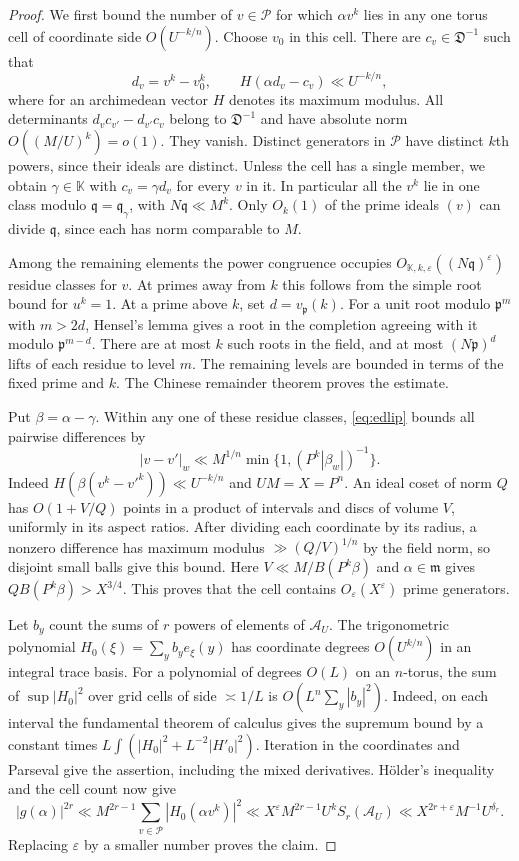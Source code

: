 \documentclass[11pt,letterpaper]{article}
\theoremstyle{definition}
\numberwithin{equation}{section}
\begin{document}
\begin{proof}
We first bound the number of $v\in\mathcal P$ for which $\alpha v^k$
lies in any one torus cell of coordinate side $O(U^{-k/n})$.
Choose $v_0$ in this cell. There are $c_v\in\mathfrak D^{-1}$ such that
\[
 d_v=v^k-v_0^k,\qquad H(\alpha d_v-c_v)\ll U^{-k/n},
\]
where for an archimedean vector $H$ denotes its maximum modulus. All
determinants $d_vc_{v'}-d_{v'}c_v$ belong to $\mathfrak D^{-1}$ and
have absolute norm $O((M/U)^k)=o(1)$. They vanish. Distinct generators
in $\mathcal P$ have distinct $k$th powers, since their ideals are
distinct. Unless the cell has a single member, we obtain
$\gamma\in\mathbb K$ with $c_v=\gamma d_v$ for every $v$ in it.
In particular all the $v^k$ lie in one class modulo
$\mathfrak q=\mathfrak q_\gamma$, with $N\mathfrak q\ll M^k$.
Only $O_k(1)$ of the prime ideals $(v)$ can divide $\mathfrak q$, since
each has norm comparable to $M$.

Among the remaining elements the power congruence occupies
$O_{\mathbb K,k,\varepsilon}((N\mathfrak q)^\varepsilon)$ residue
classes for $v$. At primes away from $k$ this follows from the simple
root bound for $u^k=1$. At a prime above $k$, set
$d=v_{\mathfrak p}(k)$. For a unit root modulo $\mathfrak p^m$ with
$m>2d$, Hensel's lemma gives a root in the completion agreeing with
it modulo $\mathfrak p^{m-d}$. There are at most $k$ such roots in the
field, and at most $(N\mathfrak p)^d$ lifts of each residue to level
$m$. The remaining levels are bounded in terms of the fixed prime and
$k$. The Chinese remainder theorem proves the estimate.

Put $\beta=\alpha-\gamma$. Within any one of these residue classes,
\eqref{eq:edlip} bounds all pairwise differences by
\[
             |v-v'|_w\ll
             M^{1/n}\min\{1,(P^k|\beta_w|)^{-1}\}.
\]
Indeed $H(\beta(v^k-v'^k))\ll U^{-k/n}$ and $UM=X=P^n$.
An ideal coset of norm $Q$ has $O(1+V/Q)$ points in a product of
intervals and discs of volume $V$, uniformly in its aspect ratios.
After dividing each coordinate by its radius, a nonzero difference
has maximum modulus $\gg(Q/V)^{1/n}$ by the field norm, so disjoint
small balls give this bound. Here $V\ll M/B(P^k\beta)$ and
$\alpha\in\mathfrak m$ gives $Q B(P^k\beta)>X^{3/4}$.
This proves that the cell contains $O_\varepsilon(X^\varepsilon)$
prime generators.

Let $b_y$ count the sums of $r$ powers of elements of $\mathcal A_U$.
The trigonometric polynomial $H_0(\xi)=\sum_y b_y e_\xi(y)$ has
coordinate degrees $O(U^{k/n})$ in an integral trace basis.
For a polynomial of degrees $O(L)$ on an $n$-torus, the sum of
$\sup |H_0|^2$ over grid cells of side $\asymp 1/L$ is
$O(L^n\sum_y|b_y|^2)$. Indeed, on each interval the fundamental
theorem of calculus gives the supremum bound by a constant times
$L\int(|H_0|^2+L^{-2}|H'_0|^2)$. Iteration in the coordinates and
Parseval give the assertion, including the mixed derivatives.
H\"older's inequality and the cell count now give
\[
 |g(\alpha)|^{2r}
 \ll M^{2r-1}\sum_{v\in\mathcal P}|H_0(\alpha v^k)|^2
 \ll X^\varepsilon M^{2r-1} U^k S_r(\mathcal A_U)
 \ll X^{2r+\varepsilon}M^{-1}U^{\delta_r}.
\]
Replacing $\varepsilon$ by a smaller number proves the claim.
\end{proof}
\end{document}
